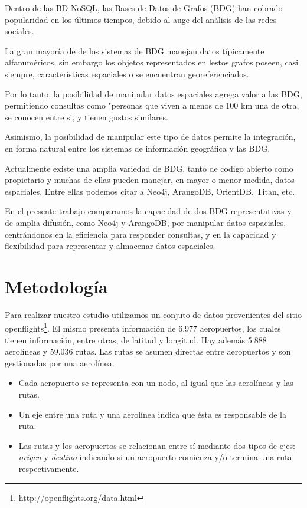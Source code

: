 \documentclass{llncs}
\begin{document}
Dentro de las BD NoSQL, las Bases de Datos de Grafos (BDG) han cobrado popularidad en los últimos tiempos, debido al auge del análisis de las redes sociales.

La gran mayoría de de los sistemas de BDG manejan datos típicamente alfanuméricos, sin embargo los objetos representados en lestos grafos poseen, casi siempre, características espaciales o se encuentran georeferenciados.

Por lo tanto, la posibilidad de manipular datos espaciales agrega valor a las BDG, permitiendo consultas como "personas que viven a menos de 100 km una de otra, se conocen entre si, y tienen gustos similares.

Asimismo, la posibilidad de manipular este tipo de datos permite la integración, en forma natural entre los sistemas de información geográfica y las BDG.

Actualmente existe una amplia variedad de BDG, tanto de codigo abierto como propietario y muchas de ellas pueden manejar, en mayor o menor medida, datos espaciales. Entre ellas podemos citar a Neo4j\cite{n4jsp}, ArangoDB\cite{adbgi}, OrientDB, Titan, etc.

En el presente trabajo comparamos la capacidad de dos BDG representativas y de amplia difusión, como Neo4j y ArangoDB, por manipular datos espaciales, centrándonos en la eficiencia para responder consultas, y en la capacidad y flexibilidad para representar y almacenar datos espaciales.

\section{Metodología}

Para realizar nuestro estudio utilizamos un conjuto de datos provenientes del sitio  openflights\footnote{http://openflights.org/data.html}. El mismo presenta información de 6.977 aeropuertos, los cuales tienen información, entre otras, de latitud y longitud. Hay además 5.888 aerolíneas y 59.036 rutas. Las rutas se asumen directas entre aeropuertos y son gestionadas por una aerolínea.

\begin{itemize}
\item Cada aeropuerto se representa con un nodo, al igual que las aerolíneas y las rutas.
\item Un eje entre una ruta y una aerolínea indica que ésta es responsable de la ruta.
\item Las rutas y los aeropuertos se relacionan entre sí mediante dos tipos de ejes: \textit{origen} y \textit{destino} indicando si un aeropuerto comienza y/o termina una ruta respectivamente.
\end{itemize}
\end{document}
